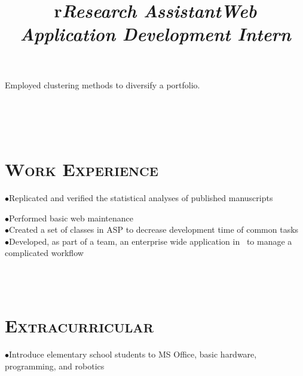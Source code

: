 \begin{resume}
\begin{position}
Employed clustering methods to diversify a portfolio.
\end{position}


\begin{formatb}
  \title{r}\\
  \\
  \body\\
\end{formatb}

\section{\textsc{Work Experience}}

\title{\textit{Research Assistant}}
\begin{position}
$\bullet$Replicated and verified the statistical analyses of published manuscripts
\end{position}


\title{\textit{Web Application Development Intern}}
\begin{position}
$\bullet$Performed basic web maintenance \\
$\bullet$Created a set of classes in ASP to decrease development time of common tasks \\
$\bullet$Developed, as part of a team, an enterprise wide application in \CSharp \ to manage a complicated workflow 
\end{position}


\begin{formatb}
  \\
  \body\\
\end{formatb}

\section{\textsc{Extracurricular}}
\begin{position}
$\bullet$Introduce elementary school students to MS Office, basic hardware, programming, and robotics
\end{position}




\end{resume}



